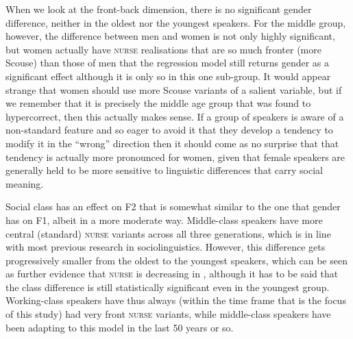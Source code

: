 When we look at the front-back dimension, there is no significant gender difference, neither in the oldest nor the youngest speakers.
For the middle group, however, the difference between men and women is not only highly significant, but women actually have \textsc{nurse} realisations that are so much fronter (more Scouse) than those of men that the regression model still returns gender as a significant effect although it is only so in this one sub-group.
It would appear strange that women should use more Scouse variants of a salient variable, but if we remember that it is precisely the middle age group that was found to hypercorrect, then this actually makes sense.
If a group of speakers is aware of a non-standard feature and so eager to avoid it that they develop a tendency to modify it in the ``wrong'' direction then it should come as no surprise that that tendency is actually more pronounced for women, given that female speakers are generally held to be more sensitive to linguistic differences that carry social meaning.

Social class has an effect on F2 that is somewhat similar to the one that gender has on F1, albeit in a more moderate way.
Middle-class speakers have more central (standard) \textsc{nurse} variants across all three generations, which is in line with most previous research in sociolinguistics.
However, this difference gets progressively smaller from the oldest to the youngest speakers, which can be seen as further evidence that \textsc{nurse} is decreasing in , although it has to be said that the class difference is still statistically significant even in the youngest group.
Working-class speakers have thus always (within the time frame that is the focus of this study) had very front \textsc{nurse} variants, while middle-class speakers have been adapting to this model in the last 50 years or so.

